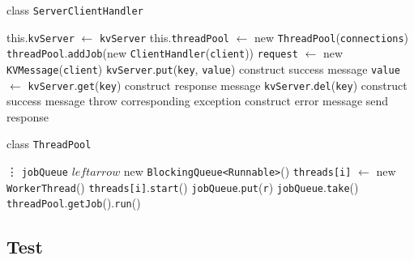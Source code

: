 \documentclass{article}
\begin{document}
\begin{algorithm}
    \caption{class \texttt{ServerClientHandler}}
	\begin{algorithmic}
            \State this.\texttt{kvServer} $\leftarrow$ \texttt{kvServer}
            \State this.\texttt{threadPool} $\leftarrow$ new \texttt{ThreadPool}(\texttt{connections})
        \EndProcedure
            \State \texttt{threadPool}.\texttt{addJob}(new \texttt{ClientHandler}(\texttt{client}))
        \EndProcedure
            \State \texttt{request} $\leftarrow$ new \texttt{KVMessage}(\texttt{client})
                \State \texttt{kvServer}.\texttt{put}(\texttt{key}, \texttt{value})
                \State construct success message
                \State \texttt{value} $\leftarrow$ \texttt{kvServer}.\texttt{get}(\texttt{key})
                \State construct response message
                \State \texttt{kvServer}.\texttt{del}(\texttt{key})
                \State construct success message
            \Else
                \State throw corresponding exception
            \EndIf
                \State construct error message
            \EndIf
            \State send response
        \EndProcedure
	\end{algorithmic}
\end{algorithm}

\begin{algorithm}
    \caption{class \texttt{ThreadPool}}
	\begin{algorithmic}
            \State \vdots
            \State \texttt{jobQueue} $leftarrow$ new \texttt{BlockingQueue<Runnable>}()
                \State \texttt{threads[i]} $\leftarrow$ new \texttt{WorkerThread}()
                \State \texttt{threads[i]}.\texttt{start}()
            \EndFor
        \EndProcedure
            \State \texttt{jobQueue}.\texttt{put}(\texttt{r})
        \EndProcedure
            \State \Return \texttt{jobQueue}.\texttt{take}()
        \EndProcedure
                \State \texttt{threadPool}.\texttt{getJob}().\texttt{run}()
            \EndWhile
        \EndProcedure
	\end{algorithmic}
\end{algorithm}
\subsection{Test}
\end{document}
